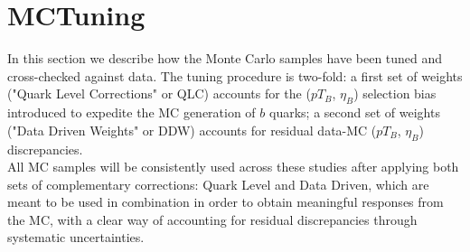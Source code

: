 \section{MCTuning}
\label{sec:MCTuning}

In this section we describe how the Monte Carlo samples have been 
tuned and cross-checked against data. The tuning procedure is two-fold: 
a first set of weights ("Quark Level Corrections" or QLC) accounts for 
the ($pT_B$, $\eta_B$) selection bias introduced to expedite the MC 
generation of $b$ quarks; a second set of weights ("Data Driven 
Weights" or DDW) accounts for  residual data-MC ($pT_B$, $\eta_B$) discrepancies.\\
All MC samples will be consistently used across these studies 
after applying both sets of complementary corrections: Quark 
Level and Data Driven, which are meant to be used in combination in 
order to obtain meaningful responses from the MC, with a clear 
way of accounting for residual discrepancies through systematic uncertainties.

